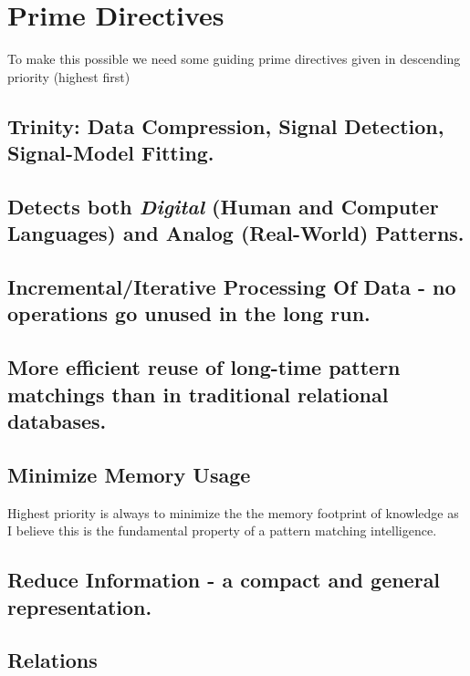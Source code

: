 \documentclass[a4paper,10pt,twocolumn]{article}
\begin{document}
\section{Prime Directives}

To make this possible we need some guiding prime directives given in descending
priority (highest first)

\subsection{Trinity: Data Compression, Signal Detection, Signal-Model Fitting.}

\subsection{Detects both \emph{Digital} (Human and Computer Languages) and
  Analog
  (Real-World) Patterns.}

\subsection{Incremental/Iterative Processing Of Data - no operations go unused
  in the long run.}

\subsection{More efficient reuse of long-time pattern matchings than in
  traditional relational databases.}

\subsection{Minimize Memory Usage}

Highest priority is always to minimize the the memory footprint of knowledge as
I believe this is the fundamental property of a pattern matching intelligence.

\subsection{Reduce Information - a compact and general representation.}

\subsection{Relations}
\end{document}
